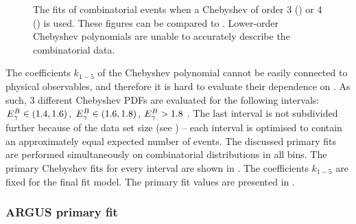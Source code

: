 \begin{figure}[htbp!]
    \centering
    \caption{\label{fig:lower_order_chebyshev}The \Mbc fits of combinatorial \BB events when a Chebyshev \PDF of order 3 () or 4 () is used.
    These figures can be compared to .
    Lower-order Chebyshev polynomials are unable to accurately describe the combinatorial \BB data.
    }
\end{figure}


The coefficients $k_{1-5}$ of the Chebyshev polynomial cannot be easily connected to physical observables,
and therefore it is hard to evaluate their dependence on \EB.
As such, 3 different Chebyshev PDFs are evaluated for the following intervals: ${E^B_{\gamma}}\in(1.4,1.6)$, ${E^B_{\gamma}}\in(1.6,1.8)$, ${E^B_{\gamma}}>1.8$ \gev.
The last interval is not subdivided further because of the data set size (see ) -- each interval is optimised to contain an approximately equal expected number of events.
The discussed primary fits are performed simultaneously on combinatorial \BB \Mbc distributions in all \EB bins.
The primary Chebyshev fits for every \EB interval are shown in .
The coefficients $k_{1-5}$ are fixed for the final \Mbc fit model.
The primary fit values are presented in .

\subsubsection{ARGUS primary fit}\label{sec:argus_prefit}


